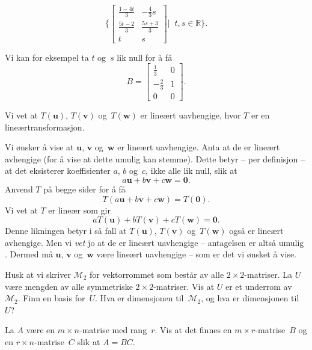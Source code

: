 \documentclass[notitlepage,a4paper,12pt,norsk]{IMFeksamen}
\newcommand{\M}{\mathcal{M}} %
\newcommand{\V}[1]{\mathbf{#1}}
\renewcommand{\u}{\V{u}}
\renewcommand{\v}{\V{v}}
\newcommand{\w}{\V{w}}
\newcommand{\0}{\V{0}}
\newcommand{\oppgslutt}{
\begin{center}
\pgfornament[width=6cm]{88}
\end{center}
}
\newenvironment{losning}{\begin{oppgave}}{\oppgslutt\end{oppgave}}
\begin{document}
\begin{losning}
\[\{\begin{bmatrix}
\frac{1-4t}{3} & -\frac{4}{3}s\\
\frac{5t-2}{3} & \frac{5s+3}{3}\\
t & s
\end{bmatrix}|\;\;t,s\in\mathbb{R}\}.
\]

Vi kan for eksempel ta $t$ og~$s$ lik null for å få
\[
B=
\begin{bmatrix}
\frac{1}{3} & 0\\
-\frac{2}{3} & 1\\
0 & 0
\end{bmatrix}.
\]
\end{losning}


\begin{losning}
Vi vet at $T(\u)$, $T(\v)$ og~$T(\w)$ er lineært uavhengige, hvor $T$ er en lineærtransformasjon. 

Vi ønsker å vise at $\u$, $\v$ og~$\w$ er lineært uavhengige. Anta at de er lineært avhengige (for å vise at dette umulig kan stemme). Dette betyr -- per definisjon -- at det eksisterer koeffisienter $a$, $b$ og~$c$, ikke alle lik null, slik at
\[
a\u+b\v+c\w=\0. 
\]
Anvend $T$ på begge sider for å få 
\[
T(a\u+b\v+c\w)=T(\0). 
\]
Vi vet at $T$ er lineær som gir
\[
aT(\u)+bT(\v)+cT(\w)=\0. 
\]
Denne likningen betyr i så fall at $T(\u)$, $T(\v)$ og~$T(\w)$ også er lineært avhengige. Men vi \emph{vet} jo at de er lineært uavhengige -- antagelsen er altså umulig . Dermed må $\u$, $\v$ og~$\w$ være lineært uavhengige -- som er det vi ønsket å vise.
\end{losning}
\begin{losning}
Husk at vi skriver $\M_2$ for vektorrommet som består av alle $2 \times 2$-matriser.
La $U$ være mengden av alle symmetriske $2 \times 2$-matriser.
Vis at $U$ er et underrom av~$\M_2$.
Finn en basis for~$U$.  Hva er dimensjonen til~$\M_2$, og hva er dimensjonen til~$U$?
\end{losning}


\begin{losning}
La $A$ være en $m \times n$-matrise med rang~$r$.
Vis at det finnes en $m \times r$-matrise~$B$ og
en $r \times n$-matrise~$C$
slik at $A = BC$.
\end{losning}
\end{document}
